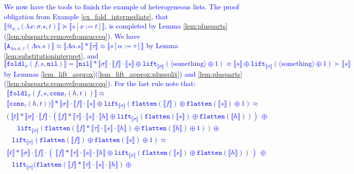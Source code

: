 \documentclass[a4paper,UKenglish,cleveref,autoref,numberwithinsect]{lipics-v2019}
\theoremstyle{definition}
\newcommand{\abs}[2]{\lambda #1.#2}
\newcommand{\tabs}[2]{\Lambda #1.#2}
\newcommand{\flatten}{\mathtt{flatten}}
\newcommand{\lift}{\mathtt{lift}}
\newcommand{\typeinterpret}[1]{\llbracket #1 \rrbracket}
\newcommand{\interpret}[1]{\llbracket #1 \rrbracket}
\newcommand{\nil}{\mathtt{nil}}
\newcommand{\cons}{\mathtt{cons}}
\newcommand{\CKchange}[1]{\textcolor{blue}{#1}}
\begin{document}
\begin{example}\label{ex_fold_final}
\CKchange{We now have the tools to finish the example of
heterogeneous lists.  The proof obligation from Example
\ref{ex_fold_intermediate}, that
$\interpret{@_{\sigma,\tau}(\abs{x:\sigma}{s},t)} \succeq
\interpret{s[x:=t]}$, is completed by
Lemma \ref{lem:plusparts}(\ref{lem:plusparts:removefromsucceq}).
We have $\interpret{\mathtt{A}_{\abs{\alpha}{\sigma},
\tau}(\tabs{\alpha}{s})} \approx \interpret{\tabs{\alpha}{s}} *
\typeinterpret{\tau} \approx \interpret{s[\alpha:=\tau]}$ by Lemma
\ref{lem:substitutioninterpret}, and
$\interpret{\mathtt{foldl}_\sigma(f,s,\nil)} =
\interpret{\nil}*\typeinterpret{\sigma} \cdot \interpret{f} \cdot
\interpret{s} \oplus \lift_{\typeinterpret{\sigma}}(\langle
\text{something}\rangle\oplus 1) \approx \interpret{s} \oplus
\lift_{\typeinterpret{\sigma}}(\langle\text{something}\rangle\oplus 1)
\succ \interpret{s}$ by Lemmas
\ref{lem_lift_approx}(\ref{lem_lift_approx:plussplit}) and
\ref{lem:plusparts}(\ref{lem:plusparts:removefromsucceq}).
}
%
\CKchange{For the last rule note that:
\[
\begin{array}{l}
\interpret{\mathtt{foldl}_\sigma(f,s,\cons_\tau(h,t))} \approx \\
\interpret{\cons_\tau(h,t))} * \typeinterpret{\sigma} \cdot \interpret{f}
\cdot \interpret{s} \oplus \lift_{\typeinterpret{\sigma}}(
\flatten(\interpret{f}) \oplus \flatten(\interpret{s}) \oplus 1) \approx \\
(\ \interpret{t} * \typeinterpret{\sigma} \cdot \interpret{f} \cdot
(\interpret{f} * \typeinterpret{\tau} \cdot \interpret{s}
\cdot \interpret{h} \oplus
\lift_{\typeinterpret{\sigma}}(\flatten(\interpret{s}) \oplus
\flatten(\interpret{h})))\ \oplus \\
\phantom{AB}
\lift_{\typeinterpret{\sigma}}(\flatten(\interpret{f} *
\typeinterpret{\tau} \cdot \interpret{s} \cdot \interpret{h}) \oplus
\flatten(\interpret{h}) \oplus 1)\ )\ \oplus \\
\phantom{A}
 \lift_{\typeinterpret{\sigma}}(\flatten(\interpret{f}) \oplus
 \flatten(\interpret{s}) \oplus 1) \approx \\
\interpret{t} * \typeinterpret{\sigma} \cdot \interpret{f} \cdot
(\ \interpret{f} * \typeinterpret{\tau} \cdot \interpret{s}
\cdot \interpret{h} \oplus 
\lift_{\typeinterpret{\sigma}}(\flatten(\interpret{s}) \oplus
\flatten(\interpret{h}))\ )\ \oplus \\
\phantom{A}
\lift_{\typeinterpret{\sigma}}(\flatten(\interpret{f} * \typeinterpret{
\tau} \cdot \interpret{s} \cdot \interpret{h}) \oplus

\end{array}\]}
\end{example}
\end{document}

